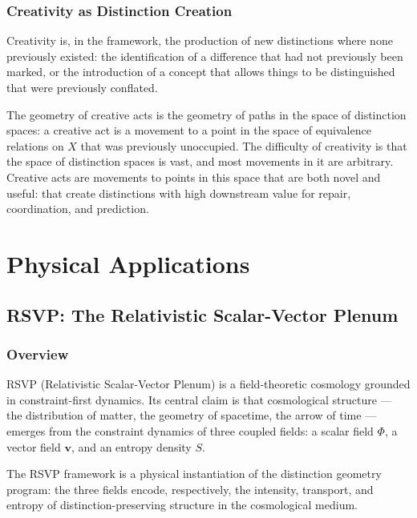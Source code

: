 \documentclass[12pt,a4paper]{book}
\theoremstyle{remark}
\theoremstyle{definition}
\begin{document}
\section{Creativity as Distinction Creation}

Creativity is, in the framework, the production of new distinctions where
none previously existed: the identification of a difference that had not
previously been marked, or the introduction of a concept that allows
things to be distinguished that were previously conflated.

The geometry of creative acts is the geometry of paths in the space of
distinction spaces: a creative act is a movement to a point in the space
of equivalence relations on $X$ that was previously unoccupied. The
difficulty of creativity is that the space of distinction spaces is vast,
and most movements in it are arbitrary. Creative acts are movements to
points in this space that are both novel and useful: that create
distinctions with high downstream value for repair, coordination,
and prediction.

\part{Physical Applications}

\chapter{RSVP: The Relativistic Scalar-Vector Plenum}

\section{Overview}

RSVP (Relativistic Scalar-Vector Plenum) is a field-theoretic cosmology
grounded in constraint-first dynamics. Its central claim is that
cosmological structure --- the distribution of matter, the geometry of
spacetime, the arrow of time --- emerges from the constraint dynamics of
three coupled fields: a scalar field $\Phi$, a vector field $\mathbf{v}$,
and an entropy density $S$.

The RSVP framework is a physical instantiation of the distinction geometry
program: the three fields encode, respectively, the intensity, transport,
and entropy of distinction-preserving structure in the cosmological medium.
\end{document}
